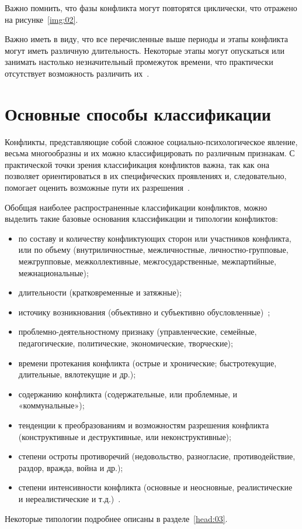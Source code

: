 Важно помнить, что фазы конфликта могут повторятся циклически, что отражено
на рисунке~\ref{img:02}.
~\\


Важно иметь в виду, что все перечисленные выше периоды и этапы конфликта могут
иметь различную длительность. Некоторые этапы могут опускаться или занимать
настолько незначительный промежуток времени, что практически отсутствует
возможность различить их~\cite{book01}.

\section{Основные способы классификации}

Конфликты, представляющие собой сложное социально-психологическое явление,
весьма многообразны и их можно классифицировать по различным признакам. С
практической точки зрения классификация конфликтов важна, так как она позволяет
ориентироваться в их специфических проявлениях и, следовательно, помогает
оценить возможные пути их разрешения~\cite{book03}.

Обобщая наиболее распространенные классификации конфликтов, можно выделить такие
базовые основания классификации и типологии конфликтов:

\begin{itemize}
    \item по составу и количеству конфликтующих сторон или участников конфликта,
        или по объему (внутриличностные, межличностные, личностно-групповые,
        межгрупповые, межколлективные, межгосударственные, межпартийные,
        межнациональные);
    \item длительности (кратковременные и затяжные);
    \item источику возникнования (объективно и субъективно
        обусловленные)~\cite{book08};
    \item проблемно-деятельностному признаку (управленческие, семейные,
        педагогические, политические, экономические, творческие);
    \item времени протекания конфликта (острые и хронические; быстротекущие,
        длительные, вялотекущие и др.);
    \item содержанию конфликта (содержательные, или проблемные, и
        «коммунальные»);
    \item тенденции к преобразованиям и возможностям разрешения конфликта
        (конструктивные и деструктивные, или неконструктивные);
    \item степени остроты противоречий (недовольство, разногласие,
        противодействие, раздор, вражда, война и др.);
    \item степени интенсивности конфликта (основные и неосновные, реалистические
        и нереалистические и т.д.)~\cite{book02}.
\end{itemize}

Некоторые типологии подробнее описаны в разделе~\ref{head:03}.

